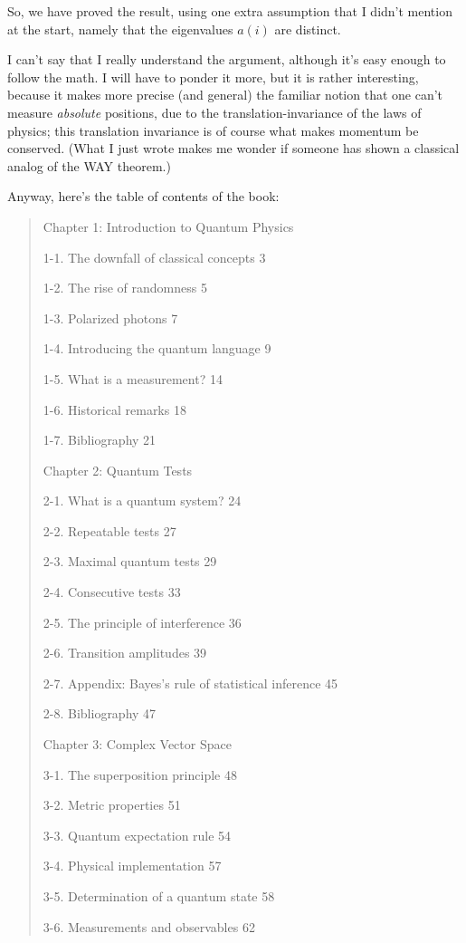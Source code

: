 \documentclass{article}
\begin{document}
So, we have proved the result, using one extra assumption that I didn't
mention at the start, namely that the eigenvalues \(a(i)\) are distinct.

I can't say that I really understand the argument, although it's easy
enough to follow the math. I will have to ponder it more, but it is
rather interesting, because it makes more precise (and general) the
familiar notion that one can't measure \emph{absolute} positions, due to
the translation-invariance of the laws of physics; this translation
invariance is of course what makes momentum be conserved. (What I just
wrote makes me wonder if someone has shown a classical analog of the WAY
theorem.)

Anyway, here's the table of contents of the book:

\begin{quote}
Chapter 1: Introduction to Quantum Physics

1-1. The downfall of classical concepts 3

1-2. The rise of randomness 5

1-3. Polarized photons 7

1-4. Introducing the quantum language 9

1-5. What is a measurement? 14

1-6. Historical remarks 18

1-7. Bibliography 21

Chapter 2: Quantum Tests

2-1. What is a quantum system? 24

2-2. Repeatable tests 27

2-3. Maximal quantum tests 29

2-4. Consecutive tests 33

2-5. The principle of interference 36

2-6. Transition amplitudes 39

2-7. Appendix: Bayes's rule of statistical inference 45

2-8. Bibliography 47

Chapter 3: Complex Vector Space

3-1. The superposition principle 48

3-2. Metric properties 51

3-3. Quantum expectation rule 54

3-4. Physical implementation 57

3-5. Determination of a quantum state 58

3-6. Measurements and observables 62


\end{quote}
\end{document}
